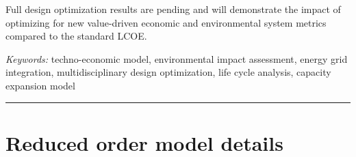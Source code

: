 \documentclass[10pt,twoside]{article}
\begin{document}
Full design optimization results are pending and will demonstrate the impact of optimizing for new value-driven economic and environmental system metrics compared to the standard LCOE.
 \hfill 

\vspace{.5\baselineskip}
\textit{Keywords:} techno-economic model, environmental impact assessment, energy grid integration, multidisciplinary design optimization, life cycle analysis, capacity expansion model

\noindent\rule{\textwidth}{0.4pt}


\appendix
\section{Reduced order model details}


\printbibliography
\end{document}
